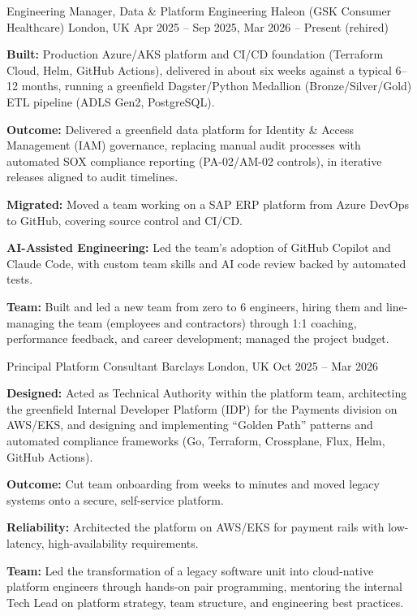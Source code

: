 \begin{cventries}

  \cvjobw
  {Engineering Manager, Data \& Platform Engineering}
  {Haleon (GSK Consumer Healthcare)}
  {London, UK}
  {Apr 2025 -- Sep 2025, Mar 2026 -- Present (rehired)}
  {
    \begin{cvitems}
      \item {\textbf{Built:} Production Azure/AKS platform and CI/CD foundation (Terraform Cloud, Helm, GitHub Actions), delivered in about
                six weeks against a typical 6--12 months, running a greenfield Dagster/Python Medallion (Bronze/Silver/Gold) ETL
                pipeline (ADLS Gen2, PostgreSQL).}
      \item {\textbf{Outcome:} Delivered a greenfield data platform for Identity \& Access Management (IAM) governance, replacing
                manual audit processes with automated SOX compliance reporting (PA-02/AM-02 controls), in iterative releases
                aligned to audit timelines.}
      \item {\textbf{Migrated:} Moved a team working on a SAP ERP platform from Azure DevOps to GitHub, covering source control
                and CI/CD.}
      \item {\textbf{AI-Assisted Engineering:} Led the team's adoption of GitHub Copilot and Claude Code, with custom team skills
                and AI code review backed by automated tests.}
      \item {\textbf{Team:} Built and led a new team from zero to 6 engineers, hiring them and line-managing the team (employees
                and contractors) through 1:1 coaching, performance feedback, and career development; managed the project budget.}
    \end{cvitems}
  }

  \cvjob
  {Principal Platform Consultant}
  {Barclays}
  {London, UK}
  {Oct 2025 -- Mar 2026}
  {
    \begin{cvitems}
      \item {\textbf{Designed:} Acted as Technical Authority within the platform team, architecting the greenfield Internal
                Developer Platform (IDP) for the Payments division on AWS/EKS, and designing and implementing ``Golden Path''
                patterns and automated compliance frameworks (Go, Terraform, Crossplane, Flux, Helm, GitHub Actions).}
      \item {\textbf{Outcome:} Cut team onboarding from weeks to minutes and moved legacy systems onto a secure, self-service platform.}
      \item {\textbf{Reliability:} Architected the platform on AWS/EKS for payment rails with low-latency, high-availability requirements.}
      \item {\textbf{Team:} Led the transformation of a legacy software unit into cloud-native platform engineers through hands-on
                pair programming, mentoring the internal Tech Lead on platform strategy, team structure, and engineering best practices.}
    \end{cvitems}
  }


\end{cventries}
